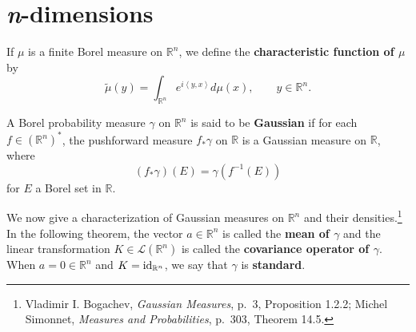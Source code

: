 \documentclass{article}
\newcommand{\inner}[2]{\left\langle #1, #2 \right\rangle}
\newcommand{\id}{\ensuremath\mathrm{id}}
\theoremstyle{definition}
\theoremstyle{definition}
\begin{document}
\section{{\em n}-dimensions}
If $\mu$ is a finite Borel measure on $\mathbb{R}^n$, we define the \textbf{characteristic function of
$\mu$} by
\[
\widetilde{\mu}(y) = \int_{\mathbb{R}^n} e^{i\inner{y}{x}} d\mu(x), \qquad y \in \mathbb{R}^n.
\]

A Borel probability measure $\gamma$ on $\mathbb{R}^n$ is said to be \textbf{Gaussian} if
for each $f \in (\mathbb{R}^n)^*$, the pushforward measure
$f_* \gamma$ on $\mathbb{R}$ is a Gaussian measure on $\mathbb{R}$, where
\[
(f_* \gamma)(E)=\gamma(f^{-1}(E))
\]
 for $E$ a Borel set in
$\mathbb{R}$.

We now give a characterization of Gaussian measures on $\mathbb{R}^n$ and their densities.\footnote{Vladimir I. Bogachev,
{\em Gaussian Measures}, p.~3, Proposition 1.2.2; Michel Simonnet, {\em Measures and Probabilities},
p.~303, Theorem 14.5.} In the following theorem, the
vector $a \in \mathbb{R}^n$  is called the \textbf{mean of $\gamma$} and the 
linear transformation $K \in \mathscr{L}(\mathbb{R}^n)$ 
 is called the \textbf{covariance  operator of $\gamma$}. When $a=0 \in \mathbb{R}^n$ and $K=\id_{\mathbb{R}^n}$, we
 say that $\gamma$ is \textbf{standard}.
\end{document}
